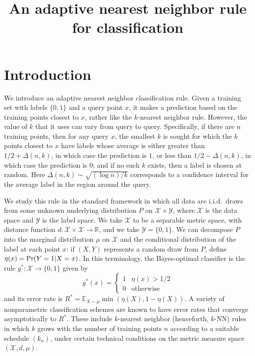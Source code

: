 \documentclass{article}
\title{An adaptive nearest neighbor rule for classification}
\def\R{{\mathbb{R}}}
\def\pr{{\rm Pr}}
\def\E{{\mathbb E}}
\def\X{{\mathcal X}}
\def\Y{{\mathcal Y}}
\begin{document}
\maketitle

\section{Introduction}

We introduce an adaptive nearest neighbor classification rule. Given a training set with labels $\{0,1\}$ and a query point $x$, it makes a prediction based on the training points closest to $x$, rather like the $k$-nearest neighbor rule. However, the value of $k$ that it uses can vary from query to query. Specifically, if there are $n$ training points, then for any query $x$, the smallest $k$ is sought for which the $k$ points closest to $x$ have labels whose average is either greater than $1/2 + \Delta(n,k)$, in which case the prediction is $1$, or less than $1/2 - \Delta(n,k)$, in which case the prediction is 0; and if no such $k$ exists, then a label is chosen at random. Here $\Delta(n,k) \sim \sqrt{(\log n)/k}$ corresponds to a confidence interval for the average label in the region around the query.

We study this rule in the standard framework in which all data are i.i.d.\ draws from some unknown underlying distribution $P$ on $\X \times \Y$, where $\X$ is the data space and $\Y$ is the label space. We take $\X$ to be a separable metric space, with distance function $d: \X \times \X \rightarrow \R$, and we take $\Y = \{0,1\}$. We can decompose $P$ into the marginal distribution $\mu$ on $\X$ and the conditional distribution of the label at each point $x$: if $(X,Y)$ represents a random draw from $P$, define $\eta(x) = \pr(Y = 1 | X = x)$. In this terminology, the Bayes-optimal classifier is the rule $g^*: \X \rightarrow \{0,1\}$ given by
$$ g^*(x) = 
\left\{
\begin{array}{ll}
1 & \mbox{$\eta(x) > 1/2$} \\
0 & \mbox{otherwise}
\end{array}
\right.
$$
and its error rate is $R^* = \E_{X \sim \mu} \min(\eta(X), 1- \eta(X))$. A variety of nonparametric classification schemes are known to have error rates that converge asymptotically to $R^*$. These include $k$-nearest neighbor (henceforth, $k$-NN) rules in which $k$ grows with the number of training points $n$ according to a suitable schedule $(k_n)$, under certain technical conditions on the metric measure space $(\X, d, \mu)$.
\end{document}
